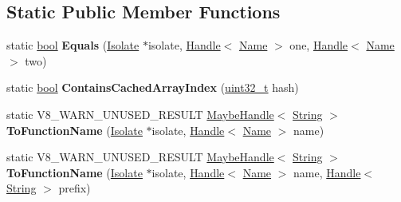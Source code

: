 \subsection*{Static Public Member Functions}
\begin{DoxyCompactItemize}
\item 
\mbox{\label{classv8_1_1internal_1_1Name_aa51afa89a0a6431c65ac7f5fe52f7c68}} 
static \mbox{\hyperlink{classbool}{bool}} {\bfseries Equals} (\mbox{\hyperlink{classv8_1_1internal_1_1Isolate}{Isolate}} $\ast$isolate, \mbox{\hyperlink{classv8_1_1internal_1_1Handle}{Handle}}$<$ \mbox{\hyperlink{classv8_1_1internal_1_1Name}{Name}} $>$ one, \mbox{\hyperlink{classv8_1_1internal_1_1Handle}{Handle}}$<$ \mbox{\hyperlink{classv8_1_1internal_1_1Name}{Name}} $>$ two)
\item 
\mbox{\label{classv8_1_1internal_1_1Name_a5b5f0518c5a54dfaa240a45c94e15a15}} 
static \mbox{\hyperlink{classbool}{bool}} {\bfseries Contains\+Cached\+Array\+Index} (\mbox{\hyperlink{classuint32__t}{uint32\+\_\+t}} hash)
\item 
\mbox{\label{classv8_1_1internal_1_1Name_ae80e4061a5fed6f1a1589ddb6791d80b}} 
static V8\+\_\+\+W\+A\+R\+N\+\_\+\+U\+N\+U\+S\+E\+D\+\_\+\+R\+E\+S\+U\+LT \mbox{\hyperlink{classv8_1_1internal_1_1MaybeHandle}{Maybe\+Handle}}$<$ \mbox{\hyperlink{classv8_1_1internal_1_1String}{String}} $>$ {\bfseries To\+Function\+Name} (\mbox{\hyperlink{classv8_1_1internal_1_1Isolate}{Isolate}} $\ast$isolate, \mbox{\hyperlink{classv8_1_1internal_1_1Handle}{Handle}}$<$ \mbox{\hyperlink{classv8_1_1internal_1_1Name}{Name}} $>$ name)
\item 
\mbox{\label{classv8_1_1internal_1_1Name_adac41f198d30bd9064e7d6202fd9c583}} 
static V8\+\_\+\+W\+A\+R\+N\+\_\+\+U\+N\+U\+S\+E\+D\+\_\+\+R\+E\+S\+U\+LT \mbox{\hyperlink{classv8_1_1internal_1_1MaybeHandle}{Maybe\+Handle}}$<$ \mbox{\hyperlink{classv8_1_1internal_1_1String}{String}} $>$ {\bfseries To\+Function\+Name} (\mbox{\hyperlink{classv8_1_1internal_1_1Isolate}{Isolate}} $\ast$isolate, \mbox{\hyperlink{classv8_1_1internal_1_1Handle}{Handle}}$<$ \mbox{\hyperlink{classv8_1_1internal_1_1Name}{Name}} $>$ name, \mbox{\hyperlink{classv8_1_1internal_1_1Handle}{Handle}}$<$ \mbox{\hyperlink{classv8_1_1internal_1_1String}{String}} $>$ prefix)
\end{DoxyCompactItemize}
